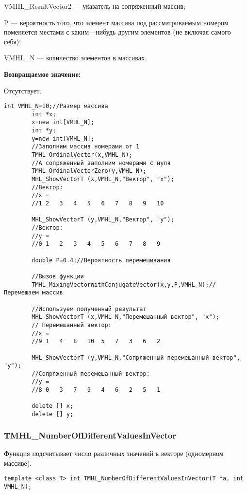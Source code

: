 \documentclass[a4paper,12pt]{article}
\begin{document}
VMHL\_ResultVector2 --- указатель на сопряженный массив;
 
P --- вероятность того, что элемент массива под рассматриваемым номером поменяется местами с каким---нибудь другим элементов (не включая самого себя);
 
VMHL\_N --- количество элементов в массивах.

\textbf{Возвращаемое значение:}

Отсутствует.


\begin{lstlisting}[label=code_use_TMHL_MixingVectorWithConjugateVector,caption=Пример использования]
        int VMHL_N=10;//Размер массива
        int *x;
        x=new int[VMHL_N];
        int *y;
        y=new int[VMHL_N];
        //Заполним массив номерами от 1
        TMHL_OrdinalVector(x,VMHL_N);
        //А сопряженный заполним номерами с нуля
        TMHL_OrdinalVectorZero(y,VMHL_N);
        MHL_ShowVectorT (x,VMHL_N,"Вектор", "x");
        //Вектор:
        //x =
        //1	2	3	4	5	6	7	8	9	10

        MHL_ShowVectorT (y,VMHL_N,"Вектор", "y");
        //Вектор:
        //y =
        //0	1	2	3	4	5	6	7	8	9

        double P=0.4;//Вероятность перемешивания

        //Вызов функции
        TMHL_MixingVectorWithConjugateVector(x,y,P,VMHL_N);//Перемешаем массив

        //Используем полученный результат
        MHL_ShowVectorT (x,VMHL_N,"Перемешанный вектор", "x");
        // Перемешанный вектор:
        //x =
        //9	1	4	8	10	5	7	3	6	2

        MHL_ShowVectorT (y,VMHL_N,"Сопряженный перемешанный вектор", "y");
        //Сопряженный перемешанный вектор:
        //y =
        //8	0	3	7	9	4	6	2	5	1

        delete [] x;
        delete [] y;
\end{lstlisting}

\subsubsection{TMHL\_NumberOfDifferentValuesInVector}\label{TMHL_NumberOfDifferentValuesInVector}

Функция подсчитывает число различных значений в векторе (одномерном массиве).


\begin{lstlisting}[label=code_syntax_TMHL_NumberOfDifferentValuesInVector,caption=Синтаксис]
template <class T> int TMHL_NumberOfDifferentValuesInVector(T *a, int VMHL_N);
\end{lstlisting}
\end{document}
